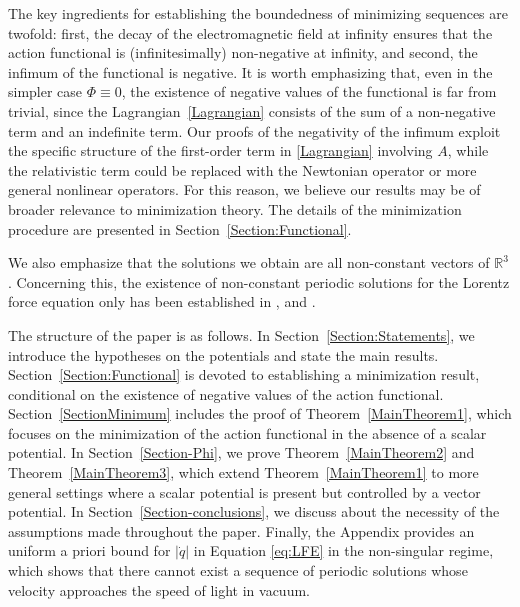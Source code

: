 \documentclass{article}
\newcommand{\R}{\mathbb{R}}
\newcommand{\dq}{\dot{q}}
\theoremstyle{definition}
\begin{document}
The key ingredients for establishing the boundedness of minimizing sequences are twofold: first, the decay of the electromagnetic field at infinity ensures that the action functional is (infinitesimally) non-negative at infinity, and second, the infimum of the functional is negative. It is worth emphasizing that, even in the simpler case \( \Phi \equiv 0 \), the existence of negative values of the functional is far from trivial, since the Lagrangian~\eqref{Lagrangian} consists of the sum of a non-negative term and an indefinite term. Our proofs of the negativity of the infimum exploit the specific structure of the first-order term in \eqref{Lagrangian} involving \( A \), while the relativistic term could be replaced  with the Newtonian operator or more general nonlinear operators. For this reason, we believe our results may be of broader relevance to minimization theory. The details of the minimization procedure are presented in Section~\ref{Section:Functional}.


We also emphasize that the solutions we obtain are all non-constant vectors of $\R^3$. Concerning this, the existence of non-constant periodic solutions for the Lorentz force equation only has been established in \cite[Theorem {10}]{ABT}, \cite[Theorem {3.7}]{AS} and \cite[Theorem 1]{GT}.

The structure of the paper is as follows. In Section~\ref{Section:Statements}, we introduce the hypotheses on the potentials and state the main results. Section~\ref{Section:Functional} is devoted to establishing a minimization result, conditional on the existence of negative values of the action functional. Section~\ref{SectionMinimum} includes the proof of Theorem~\ref{MainTheorem1}, which focuses on the minimization of the action functional in the absence of a scalar potential. In Section~\ref{Section-Phi}, we prove Theorem~\ref{MainTheorem2} and Theorem~\ref{MainTheorem3}, which extend Theorem~\ref{MainTheorem1} to more general settings where a scalar potential is present but controlled by a vector potential. In Section~\ref{Section-conclusions}, we discuss about the necessity of the assumptions made throughout the paper. Finally, the Appendix provides an uniform a priori bound for $|\dq|$ in Equation \eqref{eq:LFE} in the non-singular regime, which shows that there cannot exist a sequence of periodic solutions whose velocity approaches the speed of light in vacuum.
\end{document}
